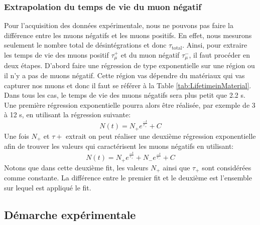 \documentclass[12pt]{article}
\begin{document}
\newpage

\subsubsection{Extrapolation du temps de vie du muon négatif}

Pour l'acquisition des données expérimentale, nous ne pouvons pas faire la différence entre les muons négatifs et les muons positifs. En effet, nous mesurons seulement le nombre total de désintégrations et donc $\tau_{\text{total}}$. Ainsi, pour extraire les temps de vie des muons positif $\tau^{+}_{\mu}$ et du muon négatif $\tau^{-}_{\mu}$, il faut procéder en deux étapes. D'abord faire une régression de type exponentielle sur une région ou il n'y a pas de muons négatif. Cette région vas dépendre du matériaux qui vas capturer nos muons et donc il faut se référer à la Table \ref{tab:LifetimeinMaterial}. Dans tous les cas, le temps de vie des muons négatifs sera plus petit que 2.2 \SIUnitSymbolMicro s. Une première régression exponentielle pourra alors être réalisée, par exemple de 3 à 12 \SIUnitSymbolMicro s, en utilisant la régression suivante:
\[ N(t) = N_{+}e^{\frac{-t}{\tau_{+}}}+C \]
Une fois $N_{+}$ et $\tau+$ extrait on peut réaliser une deuxième régression exponentielle afin de trouver les valeurs qui caractérisent les muons négatifs en utilisant:
\[ N(t) = N_{+}e^{\frac{-t}{\tau_{+}}}+N_{-}e^{\frac{-t}{\tau_{-}}}+C \]
Notons que dans cette deuxième fit, les valeurs $N_{+}$ ainsi que $\tau_{+}$ sont considérées comme constante. La différence entre le premier fit et le deuxième est l'ensemble sur lequel est appliqué le fit. 



\subsection{Démarche expérimentale}
\end{document}

